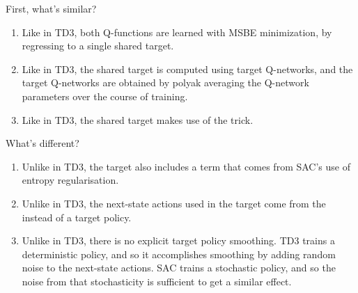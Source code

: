 \documentclass[letterpaper,10pt,english]{sphinxmanual}
\begin{document}
First, what’s similar?
\begin{enumerate}
\def\theenumi{\arabic{enumi}}
\def\labelenumi{\theenumi )}
\makeatletter\def\p@enumii{\p@enumi \theenumi )}\makeatother
\item {} 
Like in TD3, both Q-functions are learned with MSBE minimization, by regressing to a single shared target.

\item {} 
Like in TD3, the shared target is computed using target Q-networks, and the target Q-networks are obtained by polyak averaging the Q-network parameters over the course of training.

\item {} 
Like in TD3, the shared target makes use of the  trick.

\end{enumerate}

What’s different?
\begin{enumerate}
\def\theenumi{\arabic{enumi}}
\def\labelenumi{\theenumi )}
\makeatletter\def\p@enumii{\p@enumi \theenumi )}\makeatother
\item {} 
Unlike in TD3, the target also includes a term that comes from SAC’s use of entropy regularisation.

\item {} 
Unlike in TD3, the next-state actions used in the target come from the  instead of a target policy.

\item {} 
Unlike in TD3, there is no explicit target policy smoothing. TD3 trains a deterministic policy, and so it accomplishes smoothing by adding random noise to the next-state actions. SAC trains a stochastic policy, and so the noise from that stochasticity is sufficient to get a similar effect.

\end{enumerate}
\end{document}
